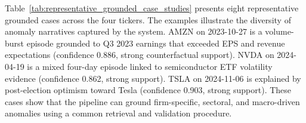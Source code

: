 \documentclass[11pt,a4paper,twoside]{article}
\begin{document}
Table~\ref{tab:representative_grounded_case_studies} presents eight representative grounded cases across the four tickers. The examples illustrate the diversity of anomaly narratives captured by the system. AMZN on 2023-10-27 is a volume-burst episode grounded to Q3 2023 earnings that exceeded EPS and revenue expectations (confidence 0.886, strong counterfactual support). NVDA on 2024-04-19 is a mixed four-day episode linked to semiconductor ETF volatility evidence (confidence 0.862, strong support). TSLA on 2024-11-06 is explained by post-election optimism toward Tesla (confidence 0.903, strong support). These cases show that the pipeline can ground firm-specific, sectoral, and macro-driven anomalies using a common retrieval and validation procedure.

\end{document}
